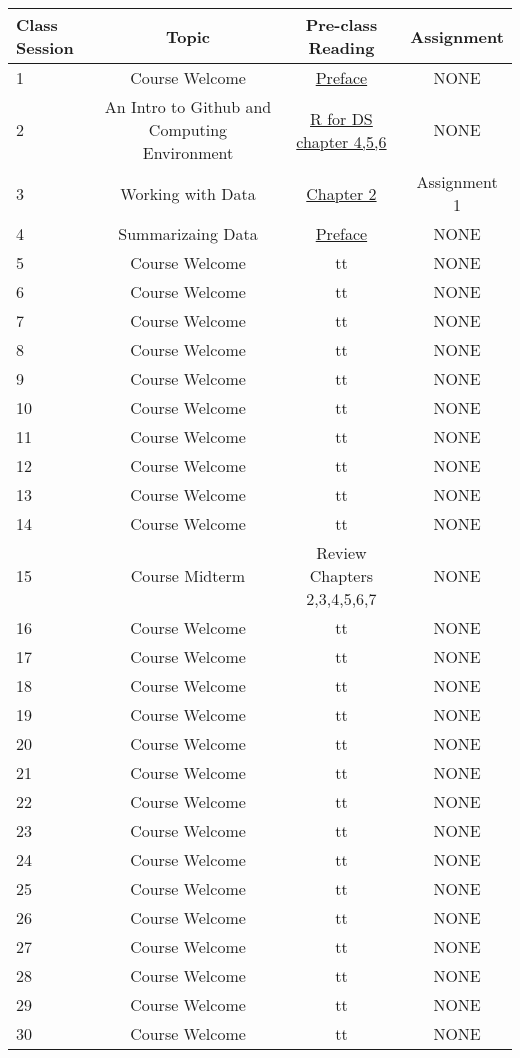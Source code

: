 \documentclass[11pt,english]{article}
\begin{document}
\begin{table}[h!]
  \begin{center}
    \label{tab:table1}
    \begin{tabular}{l|c|c|c} %
      \textbf{Class Session} & \textbf{Topic} & \textbf{Pre-class Reading} & \textbf{Assignment}\\
      \hline
      1 & Course Welcome &  \href{https://statsthinking21.github.io/statsthinking21-core-site/}{Preface} & NONE\\
      2 & An Intro to Github and Computing Environment &  \href{https://r4ds.had.co.nz/workflow-basics.html}{R for DS chapter 4,5,6} & NONE\\
      3 & Working with Data &  \href{https://statsthinking21.github.io/statsthinking21-core-site/}{Chapter 2} & Assignment 1\\
      4 & Summarizaing Data &  \href{https://statsthinking21.github.io/statsthinking21-core-site/}{Preface}  & NONE\\
      5 & Course Welcome &  tt & NONE\\
      6 & Course Welcome &  tt & NONE\\
      7 & Course Welcome &  tt & NONE\\
      8 & Course Welcome &  tt & NONE\\
      9 & Course Welcome &  tt & NONE\\
      10 & Course Welcome &  tt & NONE\\
      11 & Course Welcome &  tt & NONE\\
      12 & Course Welcome &  tt & NONE\\
      13 & Course Welcome &  tt & NONE\\
      14 & Course Welcome &  tt & NONE\\
      15 & Course Midterm &  Review Chapters 2,3,4,5,6,7 & NONE\\
      16 & Course Welcome &  tt & NONE\\
      17 & Course Welcome &  tt & NONE\\
      18 & Course Welcome &  tt & NONE\\
      19 & Course Welcome &  tt & NONE\\
      20 & Course Welcome &  tt & NONE\\
      21 & Course Welcome &  tt & NONE\\
      22 & Course Welcome &  tt & NONE\\
      23 & Course Welcome &  tt & NONE\\
      24 & Course Welcome &  tt & NONE\\
      25 & Course Welcome &  tt & NONE\\
      26 & Course Welcome &  tt & NONE\\
      27 & Course Welcome &  tt & NONE\\
      28 & Course Welcome &  tt & NONE\\
      29 & Course Welcome &  tt & NONE\\
      30 & Course Welcome &  tt & NONE\\


\end{tabular}
\end{center}
\end{table}
\end{document}

